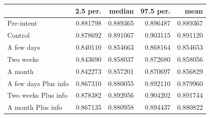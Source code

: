 \begin{tabular}{lrrrr}
\toprule
 & 2.5 per. & median & 97.5 per. & mean \\
\midrule
Pre-intent & 0.881798 & 0.889365 & 0.896487 & 0.889367 \\
Control & 0.878692 & 0.891067 & 0.903115 & 0.891120 \\
A few days & 0.840110 & 0.854663 & 0.868164 & 0.854653 \\
Two weeks & 0.843690 & 0.858037 & 0.872680 & 0.858056 \\
A month & 0.842273 & 0.857201 & 0.870697 & 0.856829 \\
A few days
Plus info & 0.867310 & 0.880055 & 0.892110 & 0.879960 \\
Two weeks
Plus info & 0.878382 & 0.892056 & 0.904202 & 0.891744 \\
A month
Plus info & 0.867135 & 0.880958 & 0.894437 & 0.880822 \\
\bottomrule
\end{tabular}
